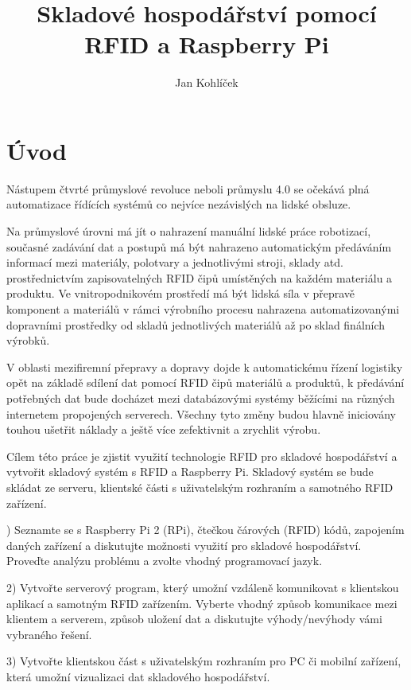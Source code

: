 \documentclass[czech,BP]{thesiskiv}
\author{Jan Kohlíček}
\title{Skladové hospodářství pomocí RFID a Raspberry Pi}
\begin{document}
\maketitle
\tableofcontents



\chapter{Úvod}

Nástupem čtvrté průmyslové revoluce neboli průmyslu 4.0 se očekává plná automatizace řídících systémů co nejvíce nezávislých na lidské obsluze.

Na průmyslové úrovni má jít o nahrazení manuální lidské práce robotizací, současné  zadávání dat a postupů má být nahrazeno automatickým předáváním informací mezi materiály, polotvary a jednotlivými stroji, sklady atd. prostřednictvím zapisovatelných RFID čipů umístěných na každém materiálu a produktu. Ve vnitropodnikovém prostředí má být lidská síla v přepravě komponent a materiálů v rámci výrobního procesu nahrazena automatizovanými dopravními prostředky od skladů jednotlivých materiálů až po sklad finálních výrobků.

V oblasti mezifiremní přepravy a dopravy dojde k automatickému řízení logistiky opět na základě sdílení dat pomocí RFID čipů materiálů a produktů, k předávání potřebných dat bude docházet mezi databázovými systémy běžícími na různých internetem propojených serverech. Všechny tyto změny budou hlavně iniciovány touhou ušetřit náklady a ještě více zefektivnit a zrychlit výrobu.

Cílem této práce je zjistit využití technologie RFID pro skladové hospodářství a vytvořit skladový systém s RFID a Raspberry Pi.
Skladový systém se bude skládat ze serveru, klientské části s uživatelským rozhraním a samotného RFID zařízení.



) Seznamte se s Raspberry Pi 2 (RPi), čtečkou čárových (RFID) kódů, zapojením daných zařízení a diskutujte možnosti využití pro skladové hospodářství. Proveďte analýzu problému a zvolte vhodný programovací jazyk. 

2) Vytvořte serverový program, který umožní vzdáleně komunikovat s klientskou aplikací a samotným RFID zařízením.
Vyberte vhodný způsob komunikace mezi klientem a serverem, způsob uložení dat a diskutujte výhody/nevýhody vámi vybraného řešení.

3) Vytvořte klientskou část s uživatelským rozhraním pro PC či mobilní zařízení, která umožní vizualizaci dat skladového hospodářství.
\end{document}
